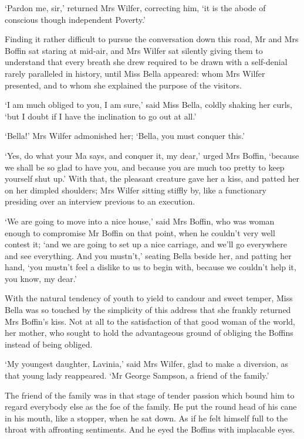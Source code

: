 ‘Pardon me, sir,’ returned Mrs Wilfer, correcting him, ‘it is the abode
of conscious though independent Poverty.’

Finding it rather difficult to pursue the conversation down this road,
Mr and Mrs Boffin sat staring at mid-air, and Mrs Wilfer sat silently
giving them to understand that every breath she drew required to be
drawn with a self-denial rarely paralleled in history, until Miss Bella
appeared: whom Mrs Wilfer presented, and to whom she explained the
purpose of the visitors.

‘I am much obliged to you, I am sure,’ said Miss Bella, coldly shaking
her curls, ‘but I doubt if I have the inclination to go out at all.’

‘Bella!’ Mrs Wilfer admonished her; ‘Bella, you must conquer this.’

‘Yes, do what your Ma says, and conquer it, my dear,’ urged Mrs Boffin,
‘because we shall be so glad to have you, and because you are much too
pretty to keep yourself shut up.’ With that, the pleasant creature gave
her a kiss, and patted her on her dimpled shoulders; Mrs Wilfer sitting
stiffly by, like a functionary presiding over an interview previous to
an execution.

‘We are going to move into a nice house,’ said Mrs Boffin, who was woman
enough to compromise Mr Boffin on that point, when he couldn’t very well
contest it; ‘and we are going to set up a nice carriage, and we’ll go
everywhere and see everything. And you mustn’t,’ seating Bella beside
her, and patting her hand, ‘you mustn’t feel a dislike to us to begin
with, because we couldn’t help it, you know, my dear.’

With the natural tendency of youth to yield to candour and sweet temper,
Miss Bella was so touched by the simplicity of this address that she
frankly returned Mrs Boffin’s kiss. Not at all to the satisfaction
of that good woman of the world, her mother, who sought to hold the
advantageous ground of obliging the Boffins instead of being obliged.

‘My youngest daughter, Lavinia,’ said Mrs Wilfer, glad to make a
diversion, as that young lady reappeared. ‘Mr George Sampson, a friend
of the family.’

The friend of the family was in that stage of tender passion which bound
him to regard everybody else as the foe of the family. He put the round
head of his cane in his mouth, like a stopper, when he sat down. As if
he felt himself full to the throat with affronting sentiments. And he
eyed the Boffins with implacable eyes.

